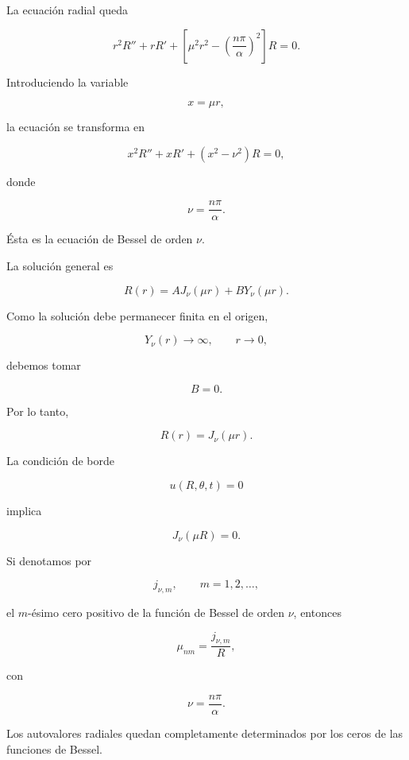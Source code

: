 \documentclass[12pt]{article}
\begin{document}
La ecuación radial queda

\begin{equation}
r^2R''
+rR'
+
\left[
\mu^2r^2
-
\left(
\frac{n\pi}{\alpha}
\right)^2
\right]
R=0.
\end{equation}

Introduciendo la variable

\[
x=\mu r,
\]

la ecuación se transforma en

\begin{equation}
x^2R''
+xR'
+
\left(
x^2-\nu^2
\right)
R=0,
\end{equation}

donde

\[
\nu=\frac{n\pi}{\alpha}.
\]

Ésta es la ecuación de Bessel de orden $\nu$.

La solución general es

\begin{equation}
R(r)
=
AJ_\nu(\mu r)
+
BY_\nu(\mu r).
\end{equation}

Como la solución debe permanecer finita en el origen,

\[
Y_\nu(r)\rightarrow\infty,
\qquad
r\rightarrow0,
\]

debemos tomar

\[
B=0.
\]

Por lo tanto,

\begin{equation}
\boxed{
R(r)
=
J_\nu(\mu r).
}
\end{equation}

La condición de borde

\[
u(R,\theta,t)=0
\]

implica

\begin{equation}
J_\nu(\mu R)=0.
\end{equation}

Si denotamos por

\[
j_{\nu,m},
\qquad
m=1,2,\ldots,
\]

el $m$-ésimo cero positivo de la función de Bessel de orden $\nu$, entonces

\begin{equation}
\boxed{
\mu_{nm}
=
\frac{j_{\nu,m}}{R},
}
\end{equation}

con

\[
\nu=\frac{n\pi}{\alpha}.
\]

Los autovalores radiales quedan completamente determinados por los ceros de las funciones de Bessel.
\end{document}
